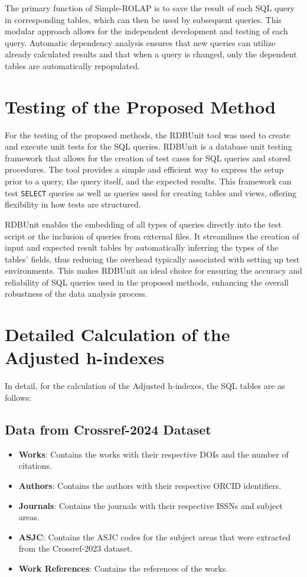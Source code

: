 The primary function of Simple-ROLAP is to save the result of each SQL query in
corresponding tables, which can then be used by subsequent queries. This
modular approach allows for the independent development and testing of each
query. Automatic dependency analysis ensures that new queries can utilize
already calculated results and that when a query is changed, only the dependent
tables are automatically repopulated.

\section{Testing of the Proposed Method}
For the testing of the proposed methods, the RDBUnit \cite{rdbunit} tool was
used to create and execute unit tests for the SQL queries. RDBUnit is a
database unit testing framework that allows for the creation of test cases for
SQL queries and stored procedures. The tool provides a simple and efficient way
to express the setup prior to a query, the query itself, and the expected
results. This framework can test \texttt{SELECT} queries as well as queries
used for creating tables and views, offering flexibility in how tests are
structured.

RDBUnit enables the embedding of all types of queries directly into the test
script or the inclusion of queries from external files. It streamlines the
creation of input and expected result tables by automatically inferring the
types of the tables' fields, thus reducing the overhead typically associated
with setting up test environments. This makes RDBUnit an ideal choice for
ensuring the accuracy and reliability of SQL queries used in the proposed
methods, enhancing the overall robustness of the data analysis process.

\section{Detailed Calculation of the Adjusted h-indexes}

In detail, for the calculation of the Adjusted h-indexes, the SQL tables are as
follows:

\subsection{Data from Crossref-2024 Dataset}
\begin{itemize}
      \item \textbf{Works}: Contains the works with their respective DOIs and the number of citations.
      \item \textbf{Authors}: Contains the authors with their respective ORCID identifiers.
      \item \textbf{Journals}: Contains the journals with their respective ISSNs and subject areas.
      \item \textbf{ASJC}: Contains the ASJC codes for the subject areas that were extracted from the Crossref-2023 dataset.
      \item \textbf{Work References}: Contains the references of the works.
\end{itemize}

